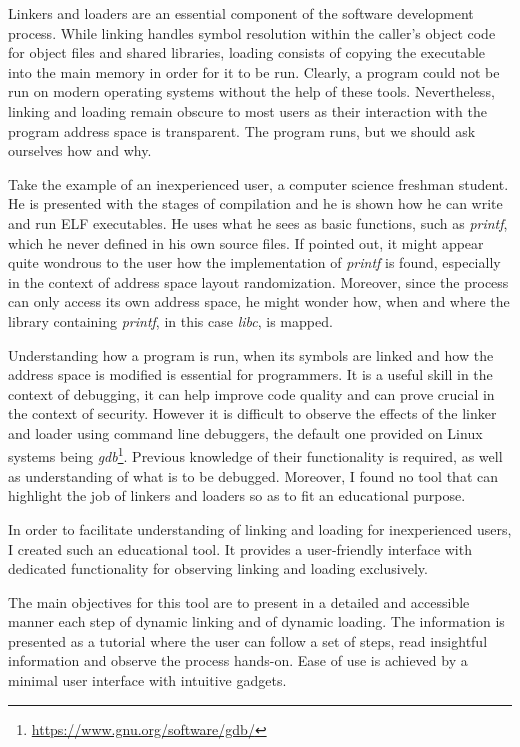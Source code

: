Linkers and loaders are an essential component of the software development process. While linking handles symbol resolution within the caller’s object code for object files and shared libraries, loading consists of copying the executable into the main memory in order for it to be run. Clearly, a program could not be run on modern operating systems without the help of these tools. Nevertheless, linking and loading remain obscure to most users as their interaction with the program address space is transparent. The program runs, but we should ask ourselves how and why.

Take the example of an inexperienced user, a computer science freshman student. He is presented with the stages of compilation and he is shown how he can write and run ELF executables. He uses what he sees as basic functions, such as \textit{printf}, which he never defined in his own source files. If pointed out, it might appear quite wondrous to the user how the implementation of \textit{printf} is found, especially in the context of address space layout randomization. Moreover, since the process can only access its own address space, he might wonder how, when and where the library containing \textit{printf}, in this case \textit{libc}, is mapped.

Understanding how a program is run, when its symbols are linked and how the address space is modified is essential for programmers. It is a useful skill in the context of debugging, it can help improve code quality and can prove crucial in the context of security. However it is difficult to observe the effects of the linker and loader using command line debuggers, the default one provided on Linux systems being \textit{gdb}\footnote{\url{https://www.gnu.org/software/gdb/}}. Previous knowledge of their functionality is required, as well as understanding of what is to be debugged. Moreover, I found no tool that can highlight the job of linkers and loaders so as to fit an educational purpose.

In order to facilitate understanding of linking and loading for inexperienced users, I created such an educational tool. It provides a user-friendly interface with dedicated functionality for observing linking and loading exclusively.

The main objectives for this tool are to present in a detailed and accessible manner each step of dynamic linking and of dynamic loading. The information is presented as a tutorial where the user can follow a set of steps, read insightful information and observe the process hands-on. Ease of use is achieved by a minimal user interface with intuitive gadgets.
